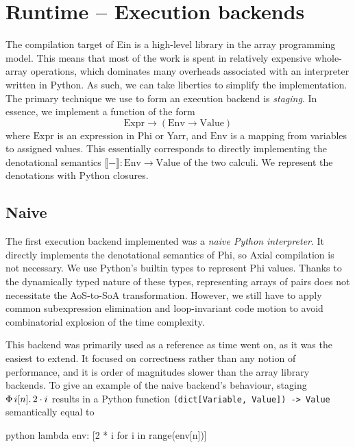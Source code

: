\section{Runtime -- Execution backends}
\label{execution-backend}

The compilation target of Ein is a high-level library in the array programming model. This means that most of the work is spent in relatively expensive whole-array operations, which dominates many overheads associated with an interpreter written in Python. As such, we can take liberties to simplify the implementation. The primary technique we use to form an execution backend is \textit{staging}. In essence, we implement a function of the form
$$ \mathrm{Expr} \to \left( \mathrm{Env} \to \mathrm{Value} \right) $$
where $\mathrm{Expr}$ is an expression in Phi or Yarr, and $\mathrm{Env}$ is a mapping from variables to assigned values. This essentially corresponds to directly implementing the denotational semantics $\llbracket - \rrbracket : \mathrm{Env} \to \mathrm{Value}$ of the two calculi. We represent the denotations with Python closures.

\subsection{Naive}

The first execution backend implemented was a \textit{naive Python interpreter}. It directly implements the denotational semantics of Phi, so Axial compilation is not necessary. We use Python's builtin types to represent Phi values. Thanks to the dynamically typed nature of these types, representing arrays of pairs does not necessitate the AoS-to-SoA transformation. However, we still have to apply common subexpression elimination and loop-invariant code motion to avoid combinatorial explosion of the time complexity.

This backend was primarily used as a reference as time went on, as it was the easiest to extend. It focused on correctness rather than any notion of performance, and it is order of magnitudes slower than the array library backends. To give an example of the naive backend's behaviour, staging $\Phi\, {i}[{n}] \ldotp {2 \cdot i}$ results in a Python function \texttt{(dict[Variable, Value]) -> Value} semantically equal to
\begin{center}
\begin{cminted}{python}
lambda env: [2 * i for i in range(env[n])]
\end{cminted}    
\end{center}

